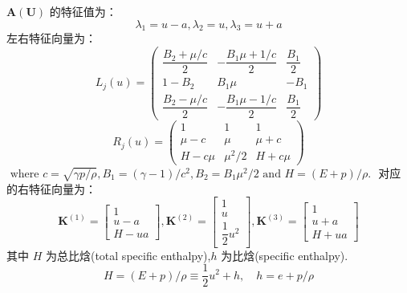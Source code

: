 \documentclass{book}
\begin{document}
$\mathbf{A}(\mathbf{U})$ 的特征值为：
\begin{equation}
    \lambda_{1}=u-a, \lambda_{2}=u, \lambda_{3}=u+a
\end{equation}
左右特征向量为\cite{RN95}：
\begin{equation}
    L_{j}(u)=\left(\begin{array}{ccc}
            \dfrac{B_{2}+\mu / c}{2} & -\dfrac{B_{1} \mu+1 / c}{2} & \dfrac{B_{1}}{2} \\
            1-B_{2}                  & B_{1} \mu                   & -B_{1}           \\
            \dfrac{B_{2}-\mu / c}{2} & -\dfrac{B_{1} \mu-1 / c}{2} & \dfrac{B_{1}}{2}
        \end{array}\right)
\end{equation}
\begin{equation}
    R_{j}(u)=\left(\begin{array}{ccc}
            1       & 1           & 1       \\
            \mu-c   & \mu         & \mu+c   \\
            H-c \mu & \mu^{2} / 2 & H+c \mu
        \end{array}\right)
\end{equation}
$\text { where } c=\sqrt{\gamma p / \rho}, B_{1}=(\gamma-1) / c^{2}, B_{2}=B_{1} \mu^{2} / 2 \text { and } H=(E+p) / \rho \text {. }$
对应的右特征向量为：
\begin{equation}
    \mathbf{K}^{(1)}=\left[\begin{array}{c}
            1   \\
            u-a \\
            H-u a
        \end{array}\right], \mathbf{K}^{(2)}=\left[\begin{array}{c}
            1 \\
            u \\
            \dfrac{1}{2} u^{2}
        \end{array}\right], \mathbf{K}^{(3)}=\left[\begin{array}{c}
            1   \\
            u+a \\
            H+u a
        \end{array}\right]
\end{equation}
其中 $H$ 为总比焓(total specific enthalpy),$h$ 为比焓(specific enthalpy).
\begin{equation}
    H=(E+p) / \rho \equiv \dfrac{1}{2} u^{2}+h, \quad h=e+p / \rho
\end{equation}
\end{document}
